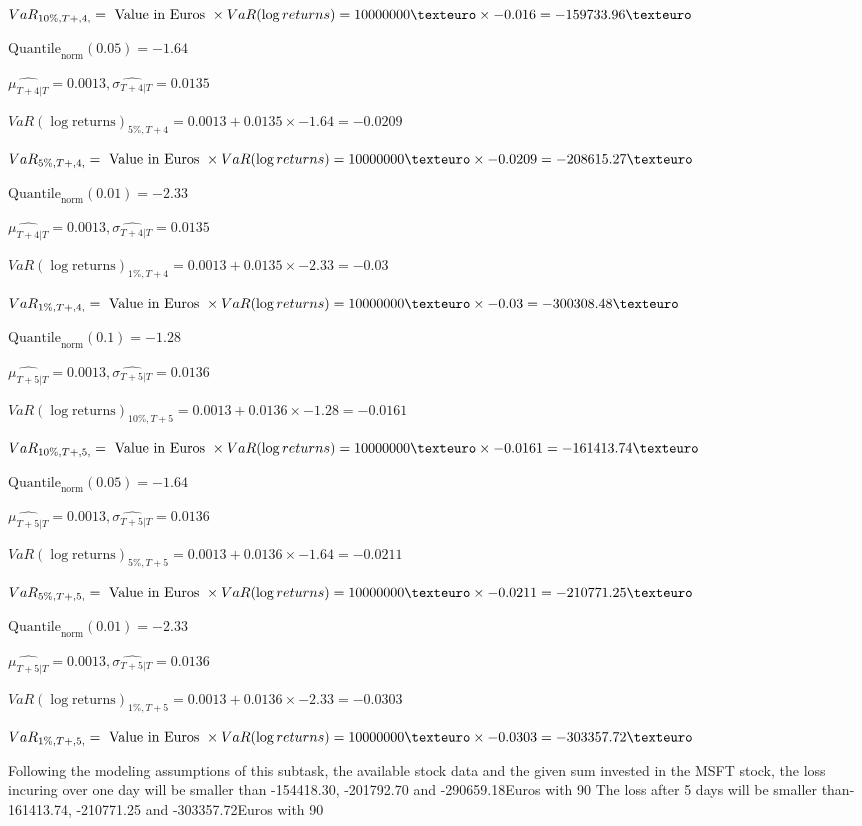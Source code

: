 $VaR_{10\%, T + ,4,} = \text{ Value in Euros } \times VaR(\log returns) = 10 000 000 \texteuro \times-0.016 = -159733.96 \texteuro$


$\text{Quantile}_\text{norm}(0.05) = -1.64$

$\hat{\mu_{T+4|T}} = 0.0013, \hat{\sigma_{T+4|T}} = 0.0135$

$VaR(\log \text{returns})_{5\%, T + 4} = 0.0013 + 0.0135\times-1.64 = -0.0209$

$VaR_{5\%, T + ,4,} = \text{ Value in Euros } \times VaR(\log returns) = 10 000 000 \texteuro \times-0.0209 = -208615.27 \texteuro$


$\text{Quantile}_\text{norm}(0.01) = -2.33$

$\hat{\mu_{T+4|T}} = 0.0013, \hat{\sigma_{T+4|T}} = 0.0135$

$VaR(\log \text{returns})_{1\%, T + 4} = 0.0013 + 0.0135\times-2.33 = -0.03$

$VaR_{1\%, T + ,4,} = \text{ Value in Euros } \times VaR(\log returns) = 10 000 000 \texteuro \times-0.03 = -300308.48 \texteuro$


$\text{Quantile}_\text{norm}(0.1) = -1.28$

$\hat{\mu_{T+5|T}} = 0.0013, \hat{\sigma_{T+5|T}} = 0.0136$

$VaR(\log \text{returns})_{10\%, T + 5} = 0.0013 + 0.0136\times-1.28 = -0.0161$

$VaR_{10\%, T + ,5,} = \text{ Value in Euros } \times VaR(\log returns) = 10 000 000 \texteuro \times-0.0161 = -161413.74 \texteuro$


$\text{Quantile}_\text{norm}(0.05) = -1.64$

$\hat{\mu_{T+5|T}} = 0.0013, \hat{\sigma_{T+5|T}} = 0.0136$

$VaR(\log \text{returns})_{5\%, T + 5} = 0.0013 + 0.0136\times-1.64 = -0.0211$

$VaR_{5\%, T + ,5,} = \text{ Value in Euros } \times VaR(\log returns) = 10 000 000 \texteuro \times-0.0211 = -210771.25 \texteuro$


$\text{Quantile}_\text{norm}(0.01) = -2.33$

$\hat{\mu_{T+5|T}} = 0.0013, \hat{\sigma_{T+5|T}} = 0.0136$

$VaR(\log \text{returns})_{1\%, T + 5} = 0.0013 + 0.0136\times-2.33 = -0.0303$

$VaR_{1\%, T + ,5,} = \text{ Value in Euros } \times VaR(\log returns) = 10 000 000 \texteuro \times-0.0303 = -303357.72 \texteuro$


Following the modeling assumptions of this subtask, the available stock data and the given sum invested in the MSFT stock, the loss incuring over one day will be smaller than -154418.30, -201792.70 and -290659.18Euros with 90%
The loss after 5 days will be smaller than-161413.74, -210771.25 and -303357.72Euros with 90%
 

